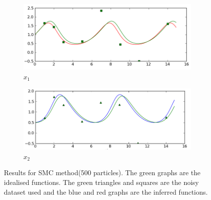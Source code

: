 \documentclass[12pt,a4paper,titlepage]{article}
\begin{document}
\begin{figure}
\centering
\begin{subfigure}{.52\linewidth}
  \centering
  \includegraphics[scale=0.48]{smc500_x1.png}
  \caption{$x_{1}$}
  \label{fig:smcx1}
\end{subfigure}%
\begin{subfigure}{.5\linewidth}
  \centering
  \includegraphics[scale=0.48]{smc500_x2.png}
  \caption{$x_{2}$}
  \label{fig:smcx2}
\end{subfigure}
\caption{Results for SMC method(500 particles). The green graphs are the idealised functions. The green triangles and squares are the noisy dataset used and the blue and red graphs are the inferred functions.}
\label{fig:smcres}
\end{figure}
\end{document}
